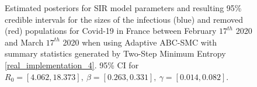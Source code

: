 \documentclass[11pt,a4paper]{article}
\theoremstyle{break}
\begin{document}
  \begin{figure}[H]
    \centering
    \caption{Estimated posteriors for SIR model parameters and resulting 95\% credible intervals for the sizes of the infectious (blue) and removed (red) populations for Covid-19 in France between February $17^{th}$ 2020 and March $17^{th}$ 2020 when using Adaptive ABC-SMC with summary statistics generated by Two-Step Minimum Entropy \ref{real_implementation_4}. 95\% CI for $R_0=[4.062,18.373],\ \beta=[0.263,0.331],\ \gamma=[0.014,0.082]$.}
    \label{fig_france_2_me}
  \end{figure}
\end{document}
